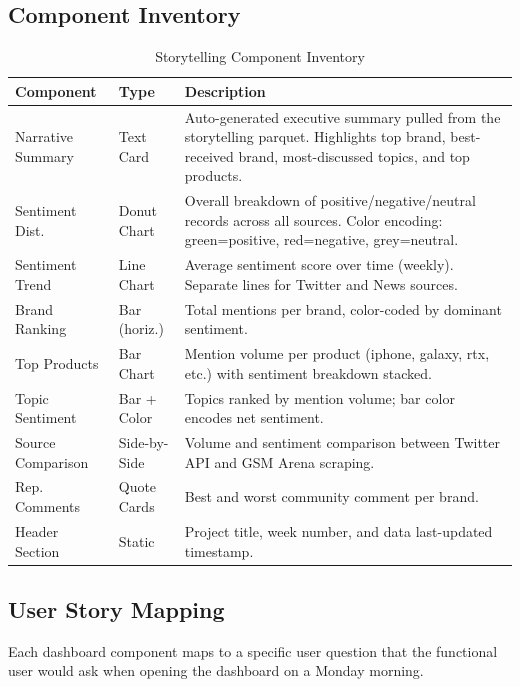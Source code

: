 \documentclass[12pt, a4paper]{article}
\begin{document}
\subsection{Component Inventory}
\begin{table}[h]
\centering
\small
\renewcommand{\arraystretch}{1.3}
\begin{tabularx}{\textwidth}{l l X}
\toprule
\textbf{Component} & \textbf{Type} & \textbf{Description} \\
\midrule
Narrative Summary & Text Card & Auto-generated executive summary pulled from the storytelling parquet. Highlights top brand, best-received brand, most-discussed topics, and top products. \\
Sentiment Dist. & Donut Chart & Overall breakdown of positive/negative/neutral records across all sources. Color encoding: green=positive, red=negative, grey=neutral. \\
Sentiment Trend & Line Chart & Average sentiment score over time (weekly). Separate lines for Twitter and News sources. \\
Brand Ranking & Bar (horiz.) & Total mentions per brand, color-coded by dominant sentiment. \\
Top Products & Bar Chart & Mention volume per product (iphone, galaxy, rtx, etc.) with sentiment breakdown stacked. \\
Topic Sentiment & Bar + Color & Topics ranked by mention volume; bar color encodes net sentiment. \\
Source Comparison & Side-by-Side & Volume and sentiment comparison between Twitter API and GSM Arena scraping. \\
Rep. Comments & Quote Cards & Best and worst community comment per brand. \\
Header Section & Static & Project title, week number, and data last-updated timestamp. \\
\bottomrule
\end{tabularx}
\caption{Storytelling Component Inventory}
\end{table}

\subsection{User Story Mapping}
Each dashboard component maps to a specific user question that the functional user would ask when opening the dashboard on a Monday morning.
\end{document}
